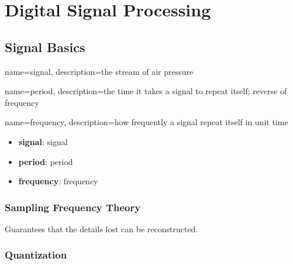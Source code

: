 \chapter{Digital Signal Processing}

\section{Signal Basics}

  {
    name=signal,
    description={the stream of air pressure}
  }

  {
    name=period,
    description={the time it takes a signal to repeat itself; reverse of
    frequency}
  }

  {
    name=frequency,
    description={how frequently a signal repeat itself in unit time}
  }

  \begin{itemize}
    \item \textbf{\Gls{signal}}: \glsdesc{signal}
    \item \textbf{\Gls{period}}: \glsdesc{period}
    \item \textbf{\Gls{frequency}}: \glsdesc{frequency}
  \end{itemize}

  \subsection{Sampling Frequency Theory}

    Guarantees that the details lost can be reconstructed.

  \subsection{Quantization}
